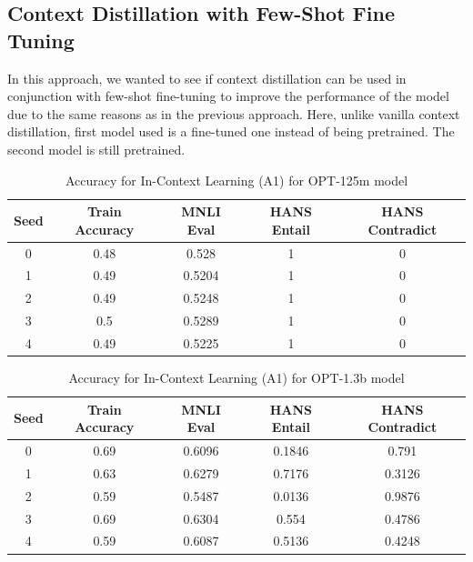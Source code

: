 \documentclass[10pt,twocolumn,letterpaper]{article}
\begin{document}
\subsection{Context Distillation with Few-Shot Fine Tuning}
In this approach, we wanted to see if context distillation can be used in conjunction with few-shot fine-tuning to improve the performance of the model due to the same reasons as
in the previous approach. Here, unlike vanilla context distillation, first model used is a fine-tuned one instead of being pretrained. The second model is still pretrained.

\begin{table}[h!]
	\begin{center}
	\begin{tabular}{|c|c|c|c|c|}
	\hline
	\textbf{Seed} & \textbf{Train Accuracy} & \textbf{MNLI Eval} & \textbf{HANS Entail} & \textbf{HANS Contradict} \\
	\hline
	\hline
	0 & 0.48 & 0.528 & 1 & 0 \\
	1 & 0.49 & 0.5204 & 1 & 0 \\
	2 & 0.49 & 0.5248 & 1 & 0 \\
	3 & 0.5 & 0.5289 & 1 & 0 \\
	4 & 0.49 & 0.5225 & 1 & 0 \\
	\hline
	\end{tabular}
	\end{center}
	\caption{Accuracy for In-Context Learning (A1) for OPT-125m model}
	\end{table}
	
	
	\begin{table}[h!]
	\begin{center}
	\begin{tabular}{|c|c|c|c|c|}
	\hline
	\textbf{Seed} & \textbf{Train Accuracy} & \textbf{MNLI Eval} & \textbf{HANS Entail} & \textbf{HANS Contradict} \\
	\hline
	\hline
	0 & 0.69 & 0.6096 & 0.1846 & 0.791 \\
	1 & 0.63 & 0.6279 & 0.7176 & 0.3126 \\
	2 & 0.59 & 0.5487 & 0.0136 & 0.9876 \\
	3 & 0.69 & 0.6304 & 0.554 & 0.4786 \\
	4 & 0.59 & 0.6087 & 0.5136 & 0.4248 \\
	\hline
	\end{tabular}
	\end{center}
	\caption{Accuracy for In-Context Learning (A1) for OPT-1.3b model}
	\end{table}
	
\end{document}
